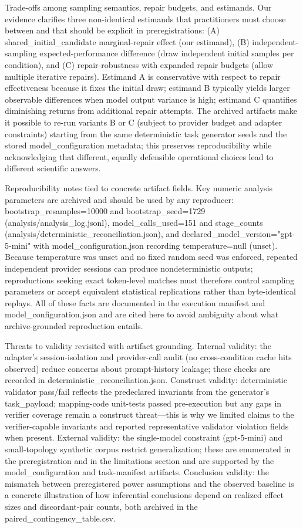 \documentclass[conference]{IEEEtran}
\begin{document}
Trade-offs among sampling semantics, repair budgets, and estimands. Our evidence clarifies three non-identical estimands that practitioners must choose between and that should be explicit in preregistrations: (A) shared\_initial\_candidate marginal-repair effect (our estimand), (B) independent-sampling expected-performance difference (draw independent initial samples per condition), and (C) repair-robustness with expanded repair budgets (allow multiple iterative repairs). Estimand A is conservative with respect to repair effectiveness because it fixes the initial draw; estimand B typically yields larger observable differences when model output variance is high; estimand C quantifies diminishing returns from additional repair attempts. The archived artifacts make it possible to re-run variants B or C (subject to provider budget and adapter constraints) starting from the same deterministic task generator seeds and the stored model\_configuration metadata; this preserves reproducibility while acknowledging that different, equally defensible operational choices lead to different scientific answers.

Reproducibility notes tied to concrete artifact fields. Key numeric analysis parameters are archived and should be used by any reproducer: bootstrap\_resamples=10000 and bootstrap\_seed=1729 (analysis/analysis\_log.jsonl), model\_calls\_used=151 and stage\_counts (analysis/deterministic\_reconciliation.json), and declared\_model\_version="gpt-5-mini" with model\_configuration.json recording temperature=null (unset). Because temperature was unset and no fixed random seed was enforced, repeated independent provider sessions can produce nondeterministic outputs; reproductions seeking exact token-level matches must therefore control sampling parameters or accept equivalent statistical replications rather than byte-identical replays. All of these facts are documented in the execution manifest and model\_configuration.json and are cited here to avoid ambiguity about what archive-grounded reproduction entails.

Threats to validity revisited with artifact grounding. Internal validity: the adapter's session-isolation and provider-call audit (no cross-condition cache hits observed) reduce concerns about prompt-history leakage; these checks are recorded in deterministic\_reconciliation.json. Construct validity: deterministic validator pass/fail reflects the predeclared invariants from the generator's task\_payload; mapping-code unit-tests passed pre-execution but any gaps in verifier coverage remain a construct threat---this is why we limited claims to the verifier-capable invariants and reported representative validator violation fields when present. External validity: the single-model constraint (gpt-5-mini) and small-topology synthetic corpus restrict generalization; these are enumerated in the preregistration and in the limitations section and are supported by the model\_configuration and task-manifest artifacts. Conclusion validity: the mismatch between preregistered power assumptions and the observed baseline is a concrete illustration of how inferential conclusions depend on realized effect sizes and discordant-pair counts, both archived in the paired\_contingency\_table.csv.
\end{document}
